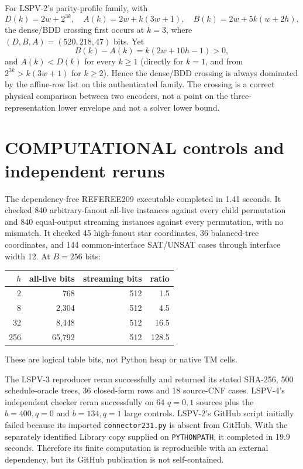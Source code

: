 \documentclass[11pt]{article}
\begin{document}
For LSPV-2's parity-profile family, with
\[
 D(k)=2w+2^{3k},\quad A(k)=2w+k(3w+1),\quad
 B(k)=2w+5k(w+2h),
\]
the dense/BDD crossing first occurs at $k=3$, where $(D,B,A)=(520,218,47)$ bits.  Yet
\[
B(k)-A(k)=k(2w+10h-1)>0,
\]
and $A(k)<D(k)$ for every $k\ge1$ (directly for $k=1$, and from
$2^{3k}>k(3w+1)$ for $k\ge2$).  Hence the dense/BDD crossing is always dominated by the affine-row
list on this authenticated family.  The crossing is a correct physical comparison between two
encoders, not a point on the three-representation lower envelope and not a solver lower bound.

\section{COMPUTATIONAL controls and independent reruns}

The dependency-free REFEREE209 executable completed in 1.41 seconds.  It checked 840 arbitrary-fanout
all-live instances against every child permutation and 840 equal-output streaming instances against
every permutation, with no mismatch.  It checked 45 high-fanout star coordinates, 36 balanced-tree
coordinates, and 144 common-interface SAT/UNSAT cases through interface width 12.  At $B=256$ bits:
\begin{center}
\begin{tabular}{rrrr}
\toprule
$h$ & all-live bits & streaming bits & ratio\\
\midrule
2&768&512&1.5\\
8&2,304&512&4.5\\
32&8,448&512&16.5\\
256&65,792&512&128.5\\
\bottomrule
\end{tabular}
\end{center}
These are logical table bits, not Python heap or native TM cells.

The LSPV-3 reproducer reran successfully and returned its stated SHA-256, 500 schedule-oracle trees,
36 closed-form rows and 18 source-CNF cases.  LSPV-4's independent checker reran successfully on 64
$q=0,1$ sources plus the $b=400,q=0$ and $b=134,q=1$ large controls.  LSPV-2's GitHub script initially
failed because its imported \texttt{connector231.py} is absent from GitHub.  With the separately
identified Library copy supplied on \texttt{PYTHONPATH}, it completed in 19.9 seconds.  Therefore its
finite computation is reproducible with an external dependency, but its GitHub publication is not
self-contained.
\end{document}
